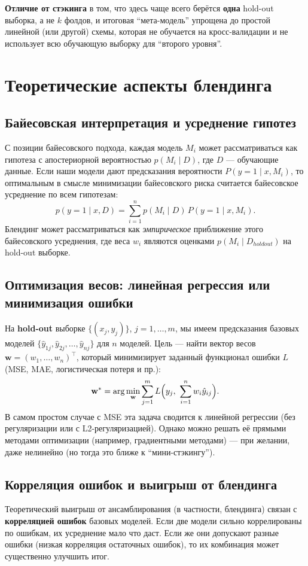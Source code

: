 \textbf{Отличие от стэкинга} в том, что здесь чаще всего берётся \textbf{одна} hold-out выборка, а не $k$ фолдов, и итоговая ``мета-модель'' упрощена до простой линейной (или другой) схемы, которая не обучается на кросс-валидации и не использует всю обучающую выборку для ``второго уровня''.

\section{Теоретические аспекты блендинга}
\subsection{Байесовская интерпретация и усреднение гипотез}
С позиции байесовского подхода, каждая модель $M_i$ может рассматриваться как гипотеза с апостериорной вероятностью $p(M_i \mid D)$, где $D$ --- обучающие данные. Если наши модели дают предсказания вероятности $P(y=1 \mid x, M_i)$, то оптимальным в смысле минимизации байесовского риска считается байесовское усреднение по всем гипотезам:
\[
    p(y=1 \mid x, D) = \sum_{i=1}^n p(M_i \mid D) \, P(y=1 \mid x, M_i).
\]
Блендинг может рассматриваться как \textit{эмпирическое} приближение этого байесовского усреднения, где веса $w_i$ являются оценками $p(M_i \mid D_{holdout})$ на hold-out выборке.

\subsection{Оптимизация весов: линейная регрессия или минимизация ошибки}
На \textbf{hold-out} выборке $\{(x_j, y_j)\}$, $j=1,\ldots,m$, мы имеем предсказания базовых моделей $ \{\hat{y}_{1j}, \hat{y}_{2j}, \dots, \hat{y}_{nj}\}$ для $n$ моделей. Цель --- найти вектор весов $\mathbf{w} = (w_1, \ldots, w_n)^\top$, который минимизирует заданный функционал ошибки $L$ (MSE, MAE, логистическая потеря и пр.):
\[
    \mathbf{w}^* = \arg\min_{\mathbf{w}} \sum_{j=1}^m L\Bigl(y_j,\ \sum_{i=1}^n w_i \hat{y}_{ij}\Bigr).
\]
В самом простом случае с MSE эта задача сводится к линейной регрессии (без регуляризации или с L2-регуляризацией). Однако можно решать её прямыми методами оптимизации (например, градиентными методами) --- при желании, даже нелинейно (но тогда это ближе к ``мини-стэкингу'').

\subsection{Корреляция ошибок и выигрыш от блендинга}
Теоретический выигрыш от ансамблирования (в частности, блендинга) связан с \textbf{корреляцией ошибок} базовых моделей. Если две модели сильно коррелированы по ошибкам, их усреднение мало что даст. Если же они допускают разные ошибки (низкая корреляция остаточных ошибок), то их комбинация может существенно улучшить итог.

